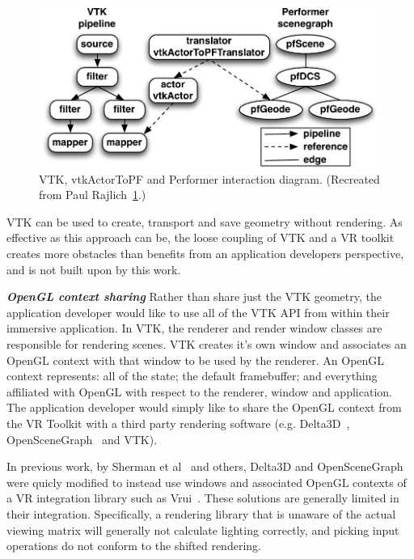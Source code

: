 \begin{figure}[h!]
 \centering
  \includegraphics[width=\linewidth]{images/vtkActorToPF.pdf}
  \caption{VTK, vtkActorToPF and Performer interaction diagram. (Recreated from Paul Rajlich~\ref{fig:vtkActorToPF}.)}
\label{fig:vtkActorToPF}
\end{figure}

VTK can be used to create, transport and save geometry without rendering. As effective as this approach can be, the loose coupling of VTK and a VR toolkit creates more obstacles than benefits from an application developers perspective, and is not built upon by this work.

\textbf{\textit{OpenGL context sharing}} Rather than share just the VTK geometry, the application developer would like to use all of the VTK API from within their immersive application.
In VTK, the renderer and render window classes are responsible for rendering scenes.
VTK creates it's own window and associates an OpenGL context with that window to be used by the renderer.
An OpenGL context represents: all of the state; the default framebuffer; and everything affiliated with OpenGL with respect to the renderer, window and application.
The application developer would simply like to share the OpenGL context from the VR Toolkit with a third party rendering software (e.g. Delta3D~\cite{McDowell:2006}, OpenSceneGraph~\cite{Wang:2010} and VTK). 

In previous work, by Sherman et al~\cite{Sherman:2010} and others, Delta3D
and OpenSceneGraph were quicly modified to instead use windows and associated
OpenGL contexts of a VR integration library such as Vrui~\cite{Kreylos:2006}.
These solutions are generally limited in their integration.
Specifically, a rendering library that is unaware of the actual
viewing matrix will generally not calculate lighting correctly, and
picking input operations do not conform to the shifted rendering.

